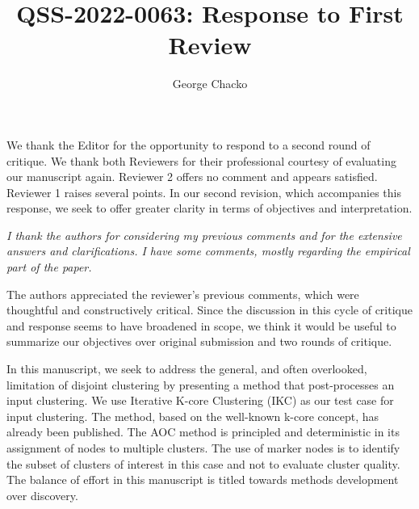 \documentclass[11pt, oneside]{article}   	%
\title{QSS-2022-0063: Response to First Review}
\author{George Chacko}
\begin{document}
\maketitle
\section*{}

We thank the Editor for the opportunity to respond to a second round of critique. We thank both Reviewers for their professional courtesy of evaluating our manuscript again. Reviewer 2 offers no comment and appears satisfied. Reviewer 1 raises several points. In our second revision, which accompanies this response, we seek to offer greater clarity in terms of objectives and interpretation.

 \vspace{2 mm} 
 \emph{I thank the authors for considering my previous comments and for the extensive answers and clarifications. I have some comments, mostly regarding the empirical part of the paper.} 
 
 \vspace{2 mm} 
The authors appreciated  the reviewer's previous comments, which were thoughtful and constructively critical. Since the discussion in this cycle of critique and response seems to have broadened in scope, we think it would be useful to summarize our objectives over original submission and two rounds of critique. 

 \vspace{2 mm} In this manuscript, we seek to address the general, and often overlooked, limitation of disjoint clustering by presenting a method that post-processes an input clustering. We use Iterative K-core Clustering (IKC) as our test case for input clustering. The method, based on the well-known k-core concept, has already been published. The AOC method is principled and deterministic in its assignment of nodes to multiple clusters. The use of marker nodes is to identify the subset of clusters of interest in this case and not to evaluate cluster quality. The balance of effort in this manuscript is titled towards methods development over discovery.
 
\end{document}
